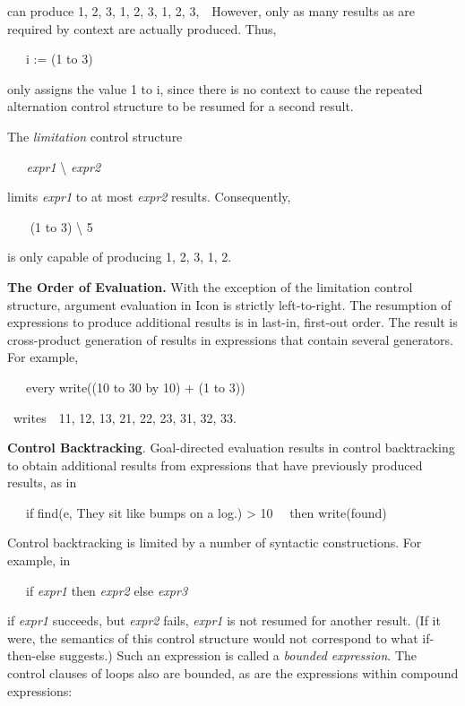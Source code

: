 \noindent can produce 1, 2, 3, 1, 2, 3, 1, 2, 3,\ \ However, only as
many results as are required by context are actually produced. Thus,

{\ttfamily\mdseries
\ \ \ i := {\textbar} (1 to 3)}

\noindent only assigns the value 1 to i, since there is no context to
cause the repeated alternation control structure to be resumed for a
second result.

The \textit{limitation }control structure

{\ttfamily\mdseries
\textit{\ \ \ expr1 }{\textbackslash} \textit{expr2}}

\noindent
limits \textit{expr1 }to at most \textit{expr2 }results. Consequently,

{\ttfamily\mdseries
\ \ \ {\textbar} (1 to 3) {\textbackslash} 5}

is only capable of producing 1, 2, 3, 1, 2.

\textbf{The Order of Evaluation.} With the exception of the limitation
control structure, argument evaluation in Icon is strictly
left-to-right. The resumption of expressions to produce additional
results is in last-in, first-out order. The result is
{\textquotedbl}cross-product{\textquotedbl} generation of results in
expressions that contain several generators. For example,

{\ttfamily\mdseries
\ \ \ every write((10 to 30 by 10) + (1 to 3))}


\ writes\ \ 11, 12, 13, 21, 22, 23, 31, 32, 33.


\textbf{Control Backtracking}. Goal-directed evaluation results in
control backtracking to obtain additional results from expressions
that have previously produced results, as in

{\ttfamily\mdseries
\ \ \ if find({\textquotedbl}e{\textquotedbl}, {\textquotedbl}They sit like bumps on a log.{\textquotedbl})
{\textgreater} 10\newline
 \ \ then write({\textquotedbl}found{\textquotedbl})}

Control backtracking is limited by a number of syntactic
constructions. For example, in

{\ttfamily\mdseries
\ \ \ if \textit{expr1 }then \textit{expr2 }else \textit{expr3}}

\noindent if \textit{expr1} succeeds, but \textit{expr2} fails,
\textit{expr1} is not resumed for another result. (If it were, the
semantics of this control structure would not correspond to what
{\textquotedbl}if-then-else{\textquotedbl} suggests.)  Such an
expression is called a \textit{bounded expression}. The control
clauses of loops also are bounded, as are the expressions within
compound expressions:

